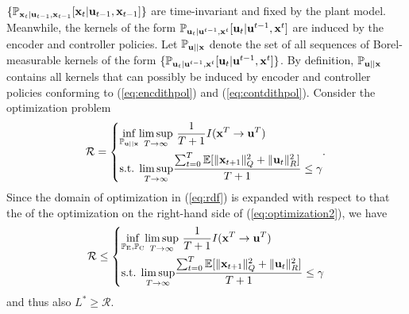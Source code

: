 \documentclass[letterpaper, 10 pt, conference]{ieeeconf}  %
\newcommand{\rvec}[1]{{\mathbf{\MakeLowercase{#1}}}}
\newcommand{\rs}[1]{\mathbf{\MakeLowercase{#1}}}
\begin{document}
$\{\mathbb{P}_{\rs{x}_{t}|\rs{u}_{t-1},\rs{x}_{t-1}}[\rs{x}_{t}|\rs{u}_{t-1},\rs{x}_{t-1}]\}$ are time-invariant and fixed by the plant model. Meanwhile, the kernels of the form
$\mathbb{P}_{\rs{u}_{t}|\rs{u}^{t-1},\rs{x}^{t}}[\rs{u}_{t}|\rs{u}^{t-1},\rs{x}^{t}]$ are induced by the encoder and controller policies. Let $\mathbb{P}_{\rs{u}||\rs{x}}$ denote the set of all sequences of Borel-measurable kernels of the form $\{\mathbb{P}_{\rs{u}_{t}|\rs{u}^{t-1},\rs{x}^{t}}[\rs{u}_{t}|\rs{u}^{t-1},\rs{x}^{t}]\}$. By definition, $\mathbb{P}_{\rs{u}||\rs{x}}$ contains all kernels that can possibly be induced by encoder and controller policies conforming  to (\ref{eq:encdithpol}) and (\ref{eq:contdithpol}). Consider the optimization problem
\begin{align}\label{eq:rdf}
    \mathcal{R} = \left\{\begin{aligned}
& \underset{\mathbb{P}_{\rs{u}||\rs{x}}}{\inf}  \underset{T\rightarrow \infty}{\lim\sup}\text{ }\frac{1}{T+1}I(\rs{x}^T\rightarrow\rs{u}^{T}) \\ &\text{s.t. }     \underset{T\rightarrow \infty}{\lim\sup}\frac{\sum\nolimits_{t=0}^{T}\mathbb{E}[\lVert \rvec{x}_{t+1} \rVert_{{Q}}^{2} +\lVert \rvec{u}_{t} \rVert_{{R}}^{2}]}{T+1} \le \gamma
\end{aligned}.\right.
\end{align} 
Since the domain of optimization in (\ref{eq:rdf}) is expanded with respect to that the of the optimization on the right-hand side of (\ref{eq:optimization2}), we have
\begin{align}
  \mathcal{R}\le \left\{\begin{aligned}
& \underset{\mathbb{P}_\mathrm{E}, \mathbb{P}_{\mathrm{C}}}{\inf}  \underset{T\rightarrow \infty}{\lim\sup}\text{ }\frac{1}{T+1}I(\rs{x}^T\rightarrow\rs{u}^{T}) \\ &\text{s.t. }    \underset{T\rightarrow \infty}{\lim\sup}\frac{\sum\nolimits_{t=0}^{T}\mathbb{E}[\lVert \rvec{x}_{t+1} \rVert_{{Q}}^{2} +\lVert \rvec{u}_{t} \rVert_{{R}}^{2}]}{T+1} \le \gamma
\end{aligned} \right.  
\end{align} and thus also $L^{*}\ge  \mathcal{R}$. 
\end{document}
